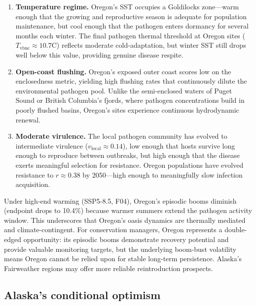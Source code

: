 \begin{enumerate}
  \item \textbf{Temperature regime.}  Oregon's SST occupies a Goldilocks
    zone---warm enough that the growing and reproductive season is
    adequate for population maintenance, but cool enough that the
    pathogen enters dormancy for several months each winter.  The final
    pathogen thermal threshold at Oregon sites ($T_\mathrm{vbnc} \approx
    10.7$\textdegree C) reflects moderate cold-adaptation, but winter
    SST still drops well below this value, providing genuine disease
    respite.

  \item \textbf{Open-coast flushing.}  Oregon's exposed outer coast
    scores low on the enclosedness metric, yielding high flushing rates
    that continuously dilute the environmental pathogen pool.  Unlike
    the semi-enclosed waters of Puget Sound or British Columbia's fjords,
    where pathogen concentrations build in poorly flushed basins, Oregon's
    sites experience continuous hydrodynamic renewal.

  \item \textbf{Moderate virulence.}  The local pathogen community has
    evolved to intermediate virulence ($v_\mathrm{local} \approx 0.14$),
    low enough that hosts survive long enough to reproduce between
    outbreaks, but high enough that the disease exerts meaningful selection
    for resistance.  Oregon populations have evolved resistance to
    $r \approx 0.38$ by 2050---high enough to meaningfully slow infection
    acquisition.
\end{enumerate}

Under high-end warming (SSP5-8.5, F04), Oregon's episodic booms diminish  
(endpoint drops to 10.4\%) because warmer summers extend the pathogen
activity window.  This underscores that Oregon's oasis dynamics are
thermally mediated and climate-contingent.  For conservation managers,
Oregon represents a double-edged opportunity: its episodic booms 
demonstrate recovery potential and provide valuable monitoring targets, 
but the underlying boom-bust volatility means Oregon cannot be relied 
upon for stable long-term persistence. Alaska's Fairweather regions 
may offer more reliable reintroduction prospects.

\subsection{Alaska's conditional optimism}

